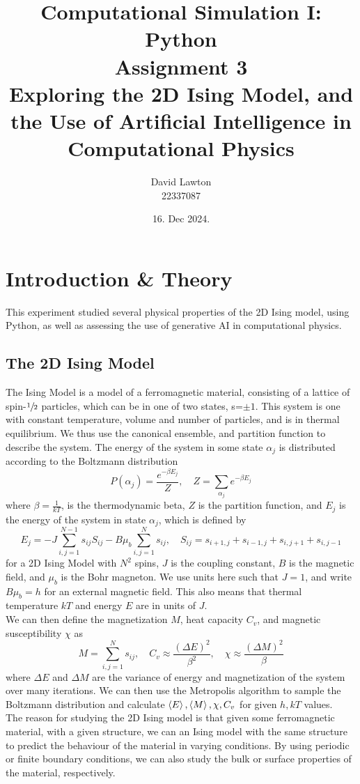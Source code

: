 \documentclass{article}
\title{Computational Simulation I: Python\\Assignment 3\\Exploring the 2D Ising Model, and the Use of Artificial Intelligence in Computational Physics}
\author{David Lawton\\22337087}
\date{16. Dec 2024.}
\theoremstyle{definition}
\theoremstyle{remark}
\begin{document}
\maketitle

\tableofcontents
\section{Introduction \& Theory}
This experiment studied several physical properties of the 2D Ising model, using Python, as well as assessing the use of generative AI in computational physics.
\subsection{The 2D Ising Model}
The Ising Model is a model of a ferromagnetic material, consisting of a lattice of spin-$\sfrac{1}{2}$ particles, which can be in one of two states, s=$\pm 1$. This system is one with constant temperature, volume and number of particles, and is in thermal equilibrium. We thus use the canonical ensemble, and partition function to describe the system. The energy of the system in some state $\alpha_j$ is distributed according to the Boltzmann distribution
\begin{equation}
    \label{eq: boltzmann}
    P(\alpha_j) = \frac{e^{-\beta E_j}}{Z}, \quad Z = \sum_{\alpha_j} e^{-\beta E_j}
\end{equation}
where $\beta = \frac{1}{kT}$, is the thermodynamic beta, $Z$ is the partition function, and $E_j$ is the energy of the system in state $\alpha_j$, which is defined by
\begin{equation}
    \label{eq: isingenergy}
    E_j = -J\sum_{i,j=1}^{N-1} s_{ij}S_{ij} - B\mu_b\sum_{i,j=1}^{N}s_{ij}, \quad S_{ij} = s_{i+1,j} + s_{i-1,j} + s_{i,j+1} + s_{i,j-1}
\end{equation}
for a 2D Ising Model with $N^2$ spins, $J$ is the coupling constant, $B$ is the magnetic field, and $\mu_b$ is the Bohr magneton. We use units here such that $J = 1$, and write $B\mu_b = h$ for an external magnetic field. This also means that thermal temperature $kT$ and energy $E$ are in units of $J$.\\
We can then define the magnetization $M$, heat capacity $C_v$, and magnetic susceptibility $\chi$ as
\begin{equation}
    \label{eq: mag,magsus,haetcap}
    M = \sum_{i,j=1}^{N}s_{ij}, \quad C_v \approx\frac{(\Delta E)^2}{\beta^2}, \quad \chi\approx\frac{(\Delta M)^2}{\beta}
\end{equation}
where $\Delta E$ and $\Delta M$ are the variance of energy and magnetization of the system over many iterations. We can then use the Metropolis algorithm to sample the Boltzmann distribution and calculate $\braket{E},\braket{M},\chi,C_v$ for given $h, kT$ values.\\
\indent The reason for studying the 2D Ising model is that given some ferromagnetic material, with a given structure, we can an Ising model with the same structure to predict the behaviour of the material in varying conditions. By using periodic or finite boundary conditions, we can also study the bulk or surface properties of the material, respectively.\\
\end{document}
